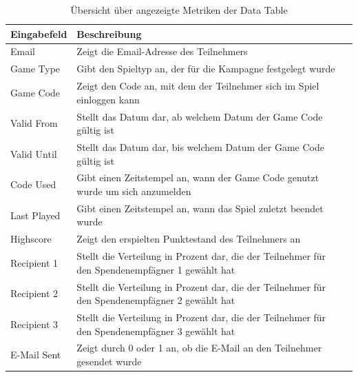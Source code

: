\documentclass[
	ngerman,
	BCOR=8mm,
	headings=normal,
	parskip=half,
	headsepline,
	automark,
	listof=totoc,
	bibliography=totoc,
]{scrreprt}
\begin{document}
\begin{table}[h]
    \centering
    \renewcommand{\arraystretch}{1.3}
    \begin{tabular}{|p{3cm}|p{6cm}|p{5cm}|}
        \hline
        \textbf{Eingabefeld} & \textbf{Beschreibung}  \\
        \hline
        Email & Zeigt die Email-Adresse des Teilnehmers \\
        \hline
        Game Type & Gibt den Spieltyp an, der für die Kampagne festgelegt wurde \\
        \hline
        Game Code & Zeigt den Code an, mit dem der Teilnehmer sich im Spiel einloggen kann \\
        \hline
        Valid From & Stellt das Datum dar, ab welchem Datum der Game Code gültig ist \\
        \hline
        Valid Until & Stellt das Datum dar, bis welchem Datum der Game Code gültig ist  \\
        \hline
        Code Used & Gibt einen Zeitstempel an, wann der Game Code genutzt wurde um sich anzumelden \\
        \hline
        Last Played & Gibt einen Zeitstempel an, wann das Spiel zuletzt beendet wurde  \\
        \hline
        Highscore & Zeigt den erspielten Punktestand des Teilnehmers an \\
        \hline
        Recipient 1 & Stellt die Verteilung in Prozent dar, die der Teilnehmer für den Spendenempfägner 1 gewählt hat \\
        \hline
        Recipient 2 & Stellt die Verteilung in Prozent dar, die der Teilnehmer für den Spendenempfägner 2 gewählt hat \\
        \hline
        Recipient 3 & Stellt die Verteilung in Prozent dar, die der Teilnehmer für den Spendenempfägner 3 gewählt hat \\
        \hline
        E-Mail Sent & Zeigt durch 0 oder 1 an, ob die E-Mail an den Teilnehmer gesendet wurde  \\
        \hline

    \end{tabular}
    \caption{Übersicht über angezeigte Metriken der Data Table}
    \label{tab:metriken_datatable}
\end{table}
\end{document}
